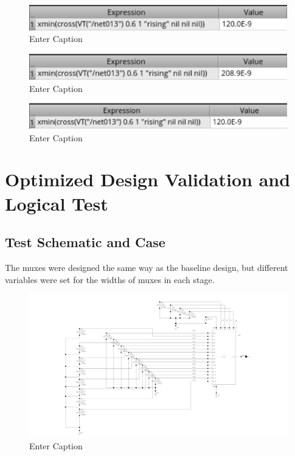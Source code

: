 \documentclass[12pt]{article}
\begin{document}
\begin{figure}[H]
    \centering
    \includegraphics[width=0.5\linewidth]{writeup//figures/wbuf3.png}
    \caption{Enter Caption}
\end{figure}


\begin{figure}[H]
    \centering
    \includegraphics[width=0.5\linewidth]{writeup//figures/wmux4.png}
    \caption{Enter Caption}
\end{figure}

\begin{figure}
    \centering
    \includegraphics[width=0.5\linewidth]{writeup//figures/wbuf4.png}
    \caption{Enter Caption}
\end{figure}



\newpage

\section{Optimized Design Validation and Logical Test}
\subsection{Test Schematic and Case}
The muxes were designed the same way as the baseline design, but different variables were set for the widths of muxes in each stage. 

\begin{figure}[H]
    \centering
    \includegraphics[width=0.5\linewidth]{writeup//figures/optimized_LUT_validation_testschem.png}
    \caption{Enter Caption}
\end{figure}
\end{document}
